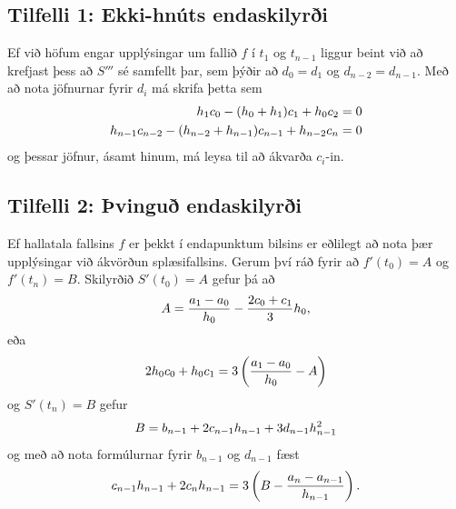 \documentclass[A4paper,10pt,icelandic]{sphinxmanual}
\begin{document}
\subsection{Tilfelli 1: Ekki-hnúts endaskilyrði}
\label{kafli03:tilfelli-1-ekki-hnuts-endaskilyri}
Ef við höfum engar upplýsingar um fallið \(f\) í \(t_1\) og
\(t_{n-1}\) liggur beint við að krefjast þess að \(S'''\) sé
samfellt þar, sem þýðir að \(d_0 = d_1\) og
\(d_{n-2} = d_{n-1}\). Með að nota jöfnurnar fyrir \(d_i\) má
skrifa þetta sem
\begin{gather}
\begin{split}\begin{aligned}
    h_1c_0 - (h_0 + h_1)c_1 + h_0c_2 = 0 \\
    h_{n-1}c_{n-2}-(h_{n-2}+h_{n-1})c_{n-1}+h_{n-2}c_n = 0\end{aligned}\end{split}\notag
\end{gather}
og þessar jöfnur, ásamt hinum, má leysa til að ákvarða \(c_i\)-in.


\subsection{Tilfelli 2: Þvinguð endaskilyrði}
\label{kafli03:tilfelli-2-vingu-endaskilyri}
Ef hallatala fallsins \(f\) er þekkt í endapunktum bilsins er
eðlilegt að nota þær upplýsingar við ákvörðun splæsifallsins. Gerum því
ráð fyrir að \(f'(t_0) = A\) og \(f'(t_n) = B\). Skilyrðið
\(S'(t_0) = A\) gefur þá að
\begin{gather}
\begin{split}A = \frac{a_1-a_0}{h_0} - \frac{2c_0+c_1}{3}h_0,\end{split}\notag
\end{gather}
eða
\begin{gather}
\begin{split}2h_0c_0 + h_0c_1 =
    3 \left( \frac{a_1-a_0}{h_0} - A \right)\end{split}\notag
\end{gather}
og \(S'(t_n) = B\) gefur
\begin{gather}
\begin{split}B = b_{n-1} + 2c_{n-1}h_{n-1} + 3d_{n-1}h_{n-1}^2\end{split}\notag
\end{gather}
og með að nota formúlurnar fyrir \(b_{n-1}\) og \(d_{n-1}\)
fæst
\begin{gather}
\begin{split}c_{n-1}h_{n-1} + 2c_nh_{n-1} =
    3 \left( B  - \frac{a_n-a_{n-1}}{h_{n-1}} \right).\end{split}\notag
\end{gather}
\end{document}

